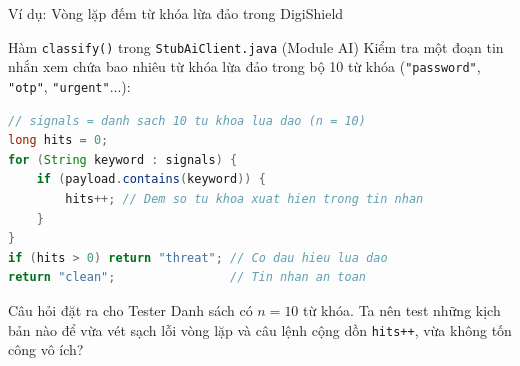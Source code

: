 \documentclass[aspectratio=169,12pt]{beamer}
\begin{document}
\begin{frame}[fragile,shrink=8]{Ví dụ: Vòng lặp đếm từ khóa lừa đảo trong DigiShield}
  \begin{block}{\small Hàm \texttt{classify()} trong \texttt{StubAiClient.java} (Module AI)}
    Kiểm tra một đoạn tin nhắn xem chứa bao nhiêu từ khóa lừa đảo trong bộ 10 từ khóa (\texttt{"password"}, \texttt{"otp"}, \texttt{"urgent"}...):
\begin{lstlisting}[language=java]
// signals = danh sach 10 tu khoa lua dao (n = 10)
long hits = 0;
for (String keyword : signals) {
    if (payload.contains(keyword)) {
        hits++; // Dem so tu khoa xuat hien trong tin nhan
    }
}
if (hits > 0) return "threat"; // Co dau hieu lua dao
return "clean";                // Tin nhan an toan
\end{lstlisting}
  \end{block}

  \vspace{0.2em}
  \begin{alertblock}{\small Câu hỏi đặt ra cho Tester}
    Danh sách có $n = 10$ từ khóa. Ta nên test những kịch bản nào để vừa vét sạch lỗi vòng lặp và câu lệnh cộng dồn \texttt{hits++}, vừa không tốn công vô ích?
  \end{alertblock}
\end{frame}
\end{document}
